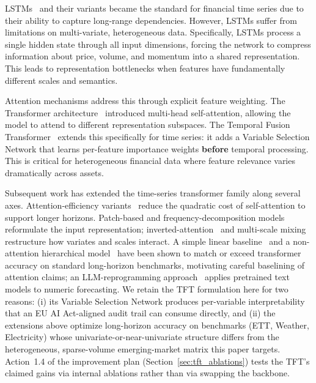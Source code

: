 \documentclass[conference]{IEEEtran}
\begin{document}
LSTMs~\cite{ref:lstm} and their variants became the standard for financial time series due to their ability to capture long-range dependencies. However, LSTMs suffer from limitations on multi-variate, heterogeneous data. Specifically, LSTMs process a single hidden state through all input dimensions, forcing the network to compress information about price, volume, and momentum into a shared representation. This leads to representation bottlenecks when features have fundamentally different scales and semantics.

Attention mechanisms address this through explicit feature weighting. The Transformer architecture~\cite{ref:vaswani} introduced multi-head self-attention, allowing the model to attend to different representation subspaces. The Temporal Fusion Transformer~\cite{IEEEhowto:kopka} extends this specifically for time series: it adds a Variable Selection Network that learns per-feature importance weights \textbf{before} temporal processing. This is critical for heterogeneous financial data where feature relevance varies dramatically across assets.

Subsequent work has extended the time-series transformer family along several axes. Attention-efficiency variants~\cite{ref:informer,ref:autoformer,ref:pyraformer,ref:fedformer} reduce the quadratic cost of self-attention to support longer horizons. Patch-based and frequency-decomposition models~\cite{ref:patchtst,ref:timesnet} reformulate the input representation; inverted-attention~\cite{ref:itransformer} and multi-scale mixing~\cite{ref:timemixer} restructure how variates and scales interact. A simple linear baseline~\cite{ref:dlinear} and a non-attention hierarchical model~\cite{ref:nhits} have been shown to match or exceed transformer accuracy on standard long-horizon benchmarks, motivating careful baselining of attention claims; an LLM-reprogramming approach~\cite{ref:timellm} applies pretrained text models to numeric forecasting. We retain the TFT formulation here for two reasons: (i) its Variable Selection Network produces per-variable interpretability that an EU AI Act-aligned audit trail can consume directly, and (ii) the extensions above optimize long-horizon accuracy on benchmarks (ETT, Weather, Electricity) whose univariate-or-near-univariate structure differs from the heterogeneous, sparse-volume emerging-market matrix this paper targets. Action~1.4 of the improvement plan (Section~\ref{sec:tft_ablations}) tests the TFT's claimed gains via internal ablations rather than via swapping the backbone.
\end{document}
